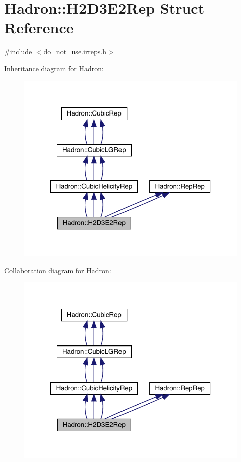 \hypertarget{structHadron_1_1H2D3E2Rep}{}\section{Hadron\+:\+:H2\+D3\+E2\+Rep Struct Reference}
\label{structHadron_1_1H2D3E2Rep}


{\ttfamily \#include $<$do\+\_\+not\+\_\+use.\+irreps.\+h$>$}



Inheritance diagram for Hadron\+:
\nopagebreak
\begin{figure}[H]
\begin{center}
\leavevmode
\includegraphics[width=320pt]{df/d3e/structHadron_1_1H2D3E2Rep__inherit__graph}
\end{center}
\end{figure}


Collaboration diagram for Hadron\+:
\nopagebreak
\begin{figure}[H]
\begin{center}
\leavevmode
\includegraphics[width=320pt]{d9/ddc/structHadron_1_1H2D3E2Rep__coll__graph}
\end{center}
\end{figure}
